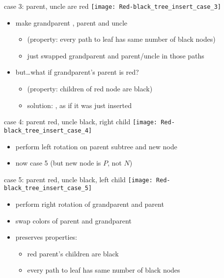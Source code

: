 \begin{frame}{case 3: parent, uncle are red}
\texttt{[image: Red-black\_tree\_insert\_case\_3]}
\begin{itemize}
\item make grandparent , parent and uncle 
    \begin{itemize}
    \item (property: every path to leaf has same number of black nodes)
    \item just swapped grandparent and parent/uncle in those paths
    \end{itemize}
\item<2-> but\ldots what if grandparent's parent is red?
    \begin{itemize}
    \item (property: children of red node are black)
    \item solution: , as if it was just inserted
    \end{itemize}
\end{itemize}
\end{frame}


\begin{frame}{case 4: parent red, uncle black, right child}
\texttt{[image: Red-black\_tree\_insert\_case\_4]}
\begin{itemize}
\item perform left rotation on parent subtree and new node
\item now case 5 (but new node is $P$, not $N$)
\end{itemize}
\end{frame}


\begin{frame}{case 5: parent red, uncle black, left child}
\texttt{[image: Red-black\_tree\_insert\_case\_5]}
\begin{itemize}
\item perform right rotation of grandparent and parent
\item swap colors of parent and grandparent
\item preserves properties:
\begin{itemize}
\item red parent's children are black
\item every path to leaf has same number of black nodes
\end{itemize}
\end{itemize}
\end{frame}

